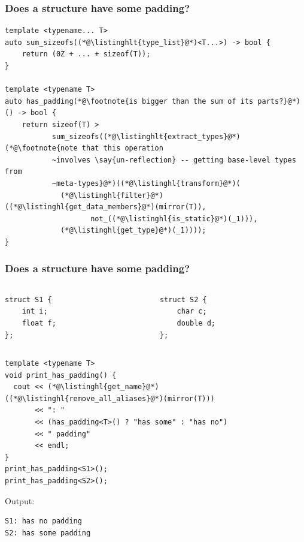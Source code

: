 \documentclass[compress,table,xcolor=table]{beamer}
\begin{document}
\begin{frame}[fragile]
  \frametitle{Does a structure have some padding?}
  \begin{lstlisting}[language=c++2x,basicstyle=\footnotesize\ttfamily]
template <typename... T>
auto sum_sizeofs((*@\listinghlt{type_list}@*)<T...>) -> bool {
    return (0Z + ... + sizeof(T));
}

template <typename T>
auto has_padding(*@\footnote{is bigger than the sum of its parts?}@*)() -> bool {
    return sizeof(T) >
           sum_sizeofs((*@\listinghlt{extract_types}@*)(*@\footnote{note that this operation
           ~involves \say{un-reflection} -- getting base-level types from
           ~meta-types}@*)((*@\listinghl{transform}@*)(
             (*@\listinghl{filter}@*)((*@\listinghl{get_data_members}@*)(mirror(T)),
                    not_((*@\listinghl{is_static}@*)(_1))),
             (*@\listinghl{get_type}@*)(_1))));
}
  \end{lstlisting}
\end{frame}
\begin{frame}[fragile]
  \frametitle{Does a structure have some padding?}
  \begin{columns}
    \begin{column}{.50\textwidth}
      \begin{lstlisting}[language=c++2x,basicstyle=\footnotesize\ttfamily]
struct S1 {
    int i;
    float f;
};
      \end{lstlisting}
    \end{column}
    \begin{column}{.40\textwidth}
      \begin{lstlisting}[language=c++2x,basicstyle=\footnotesize\ttfamily]
struct S2 {
    char c;
    double d;
};
      \end{lstlisting}
    \end{column}
  \end{columns}
  \begin{lstlisting}[language=c++2x,basicstyle=\scriptsize\ttfamily]
template <typename T>
void print_has_padding() {
  cout << (*@\listinghl{get_name}@*)((*@\listinghl{remove_all_aliases}@*)(mirror(T)))
       << ": "
       << (has_padding<T>() ? "has some" : "has no")
       << " padding"
       << endl;
}
print_has_padding<S1>();
print_has_padding<S2>();
  \end{lstlisting}
  Output:
  \begin{verbatim}
S1: has no padding
S2: has some padding
  \end{verbatim}
\end{frame}
\end{document}
